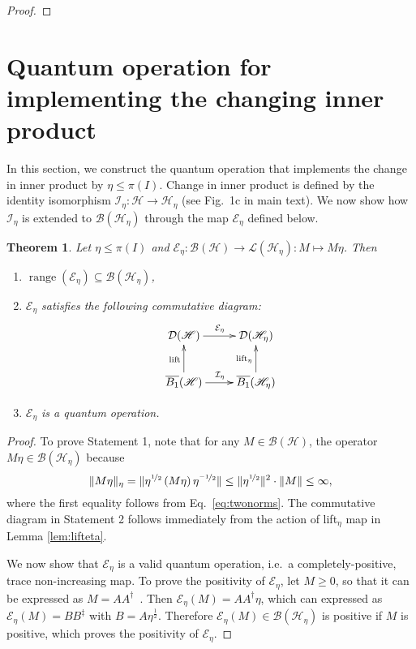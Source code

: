 \documentclass[amsmath,amssymb,aps,pra,superscriptaddress,twocolumn]{revtex4-2}
\newtheorem{theorem}{Theorem}
\begin{document}
\begin{appendix}
\begin{proof}
\end{proof}

\section{{{Quantum operation} for implementing the changing inner product}}\label{sec:channelEeta}
In this section, we construct the quantum operation that implements the change in inner product by $\eta \le \pi(I)$. 
Change in inner product is defined by the identity isomorphism $\mathcal{I}_\eta:\mathscr{H}\to\mathscr{H}_\eta$ 
(see Fig.~1c in main text).
We now show how  $\mathcal{I}_\eta$ is extended to $\mathcal{B}(\mathscr{H}_\eta)$ through the map $\mathcal{E}_\eta$ defined below.
\begin{theorem}
Let $\eta \le \pi(I)$ and $\mathcal{E}_\eta:\mathcal{B}(\mathscr{H})\to \mathcal{L}(\mathscr{H}_\eta):M \mapsto M\eta$.
Then
\begin{enumerate}
    \item $\operatorname{range}(\mathcal{E}_\eta) \subseteq \mathcal{B}(\mathscr{H}_\eta)$,
    \item $\mathcal{E}_\eta$ satisfies the following commutative diagram:
    \begin{equation}
    \xymatrix{
    \mathcal{D}(\mathscr{H}) \ar[r]^{\mathcal{E}_\eta} &  \mathcal{D}(\mathscr{H}_\eta)   \\
    \overline{B_1}(\mathscr{H}) \ar[u]^{\operatorname{lift}} \ar[r]^{\mathcal{I}_\eta} 
      & \overline{B_1}(\mathscr{H}_\eta) \ar[u]^{\operatorname{lift}_\eta} }
    \end{equation}
    \item $\mathcal{E}_\eta$ is a quantum operation.
\end{enumerate}
\end{theorem}
\begin{proof}
To prove Statement 1, note that for any $M \in \mathcal{B}\left(\mathscr{H}\right)$, the operator $M\eta \in  \mathcal{B}\left(\mathscr{H}_\eta\right)$ because
\begin{equation}
    \|M\eta\|_\eta = \|\eta^{\nicefrac{1}{2}}\left(M\eta\right)\eta^{\nicefrac{-1}{2}}\|\leq \|\eta^{\nicefrac{1}{2}}\|^2\cdot\|M\|\le \infty,
\end{equation}
where the first equality follows from Eq.~\eqref{eq:twonorms}. 
The commutative diagram in Statement 2 follows immediately from the action of lift${}_\eta$ map
in Lemma \ref{lem:lifteta}. 

We now show that $\mathcal{E}_\eta$ is a valid quantum operation,
i.e.\ a completely-positive, trace non-increasing map.
To prove the positivity of $\mathcal{E}_\eta$,
let $M \ge 0$, so that it can be expressed as $M = A A^\dagger$~\cite{Con07}. 
Then 
$\mathcal{E}_\eta(M) = A A^\dagger \eta$, which can expressed as
$\mathcal{E}_\eta(M) = BB^\ddagger$ with $B = A\eta^{\frac12}$. 
Therefore $\mathcal{E}_\eta(M) \in \mathcal{B}(\mathscr{H}_\eta)$  
is positive if $M$ is positive, which proves the positivity of $\mathcal{E}_\eta$.


\end{proof}
\end{appendix}
\end{document}
